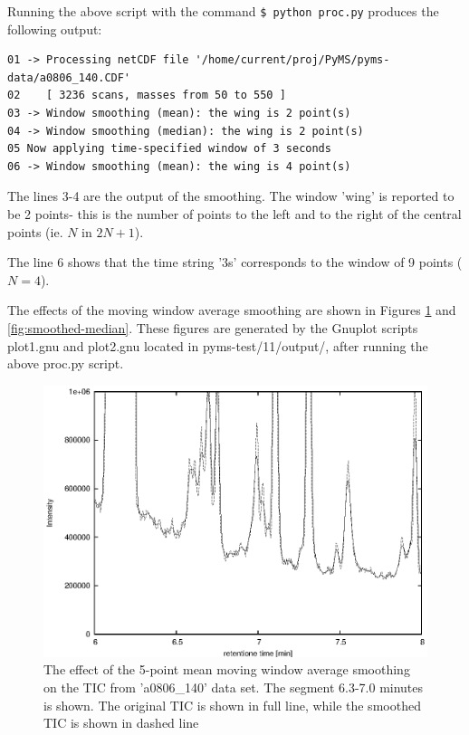Running the above script with the command {\tt \$ python proc.py} produces
the following output:

\begin{verbatim}
01 -> Processing netCDF file '/home/current/proj/PyMS/pyms-data/a0806_140.CDF'
02    [ 3236 scans, masses from 50 to 550 ]
03 -> Window smoothing (mean): the wing is 2 point(s)
04 -> Window smoothing (median): the wing is 2 point(s)
05 Now applying time-specified window of 3 seconds
06 -> Window smoothing (mean): the wing is 4 point(s)
\end{verbatim}

\noindent
The lines 3-4 are the output of the smoothing.  The window 'wing' is reported
to be 2 points- this is the number of points to the left and to the right of
the central points (ie. $N$ in $2N+1$).

\noindent
The line 6 shows that the time string '3s' corresponds to the window of
9 points ($N=4$).

The effects of the moving window average smoothing are shown in Figures 
\ref{fig:smoothed-mean} and \ref{fig:smoothed-median}. These figures are generated
by the Gnuplot scripts plot1.gnu and plot2.gnu located in
pyms-test/11/output/, after running the above proc.py script.

\begin{figure}[htp]
\begin{center}
\includegraphics{graphics/pyms-test/tic_mean_smoothed.eps}
\caption{The effect of the 5-point mean moving window average smoothing
on the TIC from 'a0806\_140' data set. The segment 6.3-7.0 minutes is
shown. The original TIC is shown in full line, while the smoothed TIC
is shown in dashed line}
\label{fig:smoothed-mean}
\end{center}
\end{figure}

